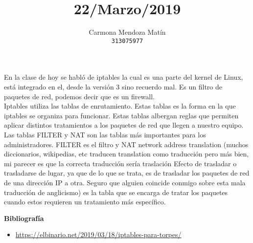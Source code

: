\documentclass[11pt, a4paper]{report}
\begin{document}
\title{22/Marzo/2019}
\author{
  Carmona Mendoza Mat\'in\\
  \texttt{313075977}
}
\date{}
\maketitle

En la clase de hoy se habló de iptables la cual es una parte del kernel de
Linux, está integrado en el, desde la versión 3 sino recuerdo mal. Es un filtro
de paquetes de red, podemos decir que es un firewall. \\

Iptables utiliza las tablas de enrutamiento. Estas tablas es la forma en la que
iptables se organiza para funcionar. Estas tablas albergan reglas que permiten
aplicar distintos tratamientos a los paquetes de red que llegen a nuestro
equipo. \\

Las tablas FILTER y NAT son las tablas más importantes para los
administradores. FILTER es el filtro y NAT network address translation
(muchos diccionarios, wikipedias, etc traducen translation como traducción pero
más bien, mi parecer es que la correcta traducción sería traslación Efecto de
trasladar o trasladarse de lugar, ya que de lo que se trata, es de trasladar
los paquetes de red de una dirección IP a otra. Seguro que alguien coincide
conmigo sobre esta mala traducción de anglicismo) es la tabla que se encarga de
tratar los paquetes cuando estos requieren un tratamiento más específico. \\


\newpage

\textbf{Bibliografía} \\

\begin{itemize}

\item \url{https://elbinario.net/2019/03/18/iptables-para-torpes/}


\end{itemize}
\end{document}
